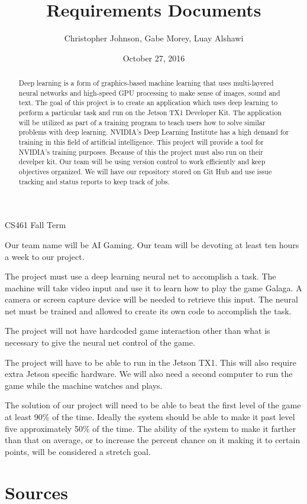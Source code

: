 \documentclass[letterpaper,10pt]{article}
\author{Christopher Johnson, Gabe Morey, Luay Alshawi}
\title{Requirements Documents}
\date{October 27, 2016}
\begin{document}
\begin{titlingpage}
\maketitle
CS461 Fall Term

\begin{abstract}
Deep learning is a form of graphics-based machine learning that uses multi-layered neural networks and high-speed 
GPU processing to make sense of images, sound and text. 
The goal of this project is to create an application which uses deep learning to perform a particular task and run on the Jetson TX1 Developer Kit.
The application will be utilized as part of a training program to teach users how to solve similar problems with deep learning. NVIDIA's Deep Learning Institute has a high demand for training in this field of artificial intelligence. 
This project will provide a tool for NVIDIA's training purposes. 
Because of this the project must also run on their develper kit.
Our team will be using version control to work efficiently and keep objectives organized. 
We will have our repository stored on Git Hub and use issue tracking and status reports to keep track of jobs.
\end{abstract}

\end{titlingpage}
Our team name will be AI Gaming.
Our team will be devoting at least ten hours a week to our project. 

The project must use a deep learning neural net to accomplish a task.
The machine will take video input and use it to learn how to play the game Galaga. 
A camera or screen capture device will be needed to retrieve this input. 
The neural net must be trained and allowed to create its own code to accomplish the task.

The project will not have hardcoded game interaction other than what is necessary to give the neural net control of the game.

The project will have to be able to run in the Jetson TX1. 
This will also require extra Jetson specific hardware.
We will also need a second computer to run the game while the machine watches and plays.

The solution of our project will need to be able to beat the first level of the game at least 90\% of the time. 
Ideally the system should be able to make it past level five approximately 50\% of the time.
The ability of the system to make it farther than that on average, or to increase the percent chance on it making it to certain points, will be considered a stretch goal.

\section{Sources}
\end{document}
